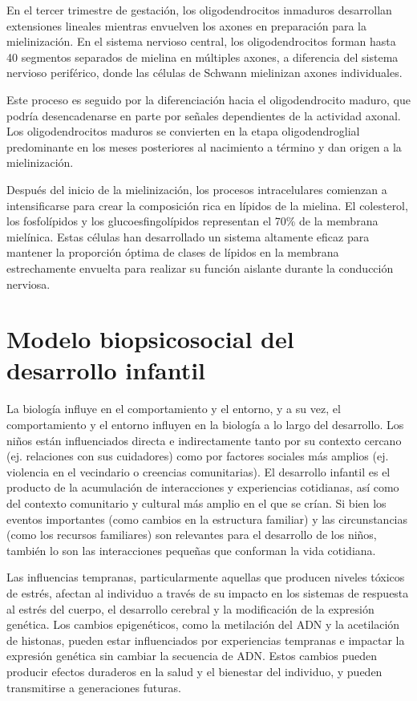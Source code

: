 \documentclass[11pt,letterpaper]{report}
\begin{document}
En el tercer trimestre de gestación, los oligodendrocitos inmaduros desarrollan
extensiones lineales mientras envuelven los axones en preparación para la
mielinización. En el sistema nervioso central, los oligodendrocitos forman
hasta 40 segmentos separados de mielina en múltiples axones, a diferencia del
sistema nervioso periférico, donde las células de Schwann mielinizan axones
individuales. \cite{Polin124}

Este proceso es seguido por la diferenciación hacia el oligodendrocito maduro,
que podría desencadenarse en parte por señales dependientes de la actividad
axonal. Los oligodendrocitos maduros se convierten en la etapa oligodendroglial
predominante en los meses posteriores al nacimiento a término y dan origen a la
mielinización. \cite{Polin124}

Después del inicio de la mielinización, los procesos intracelulares comienzan a
intensificarse para crear la composición rica en lípidos de la mielina. El
colesterol, los fosfolípidos y los glucoesfingolípidos representan el 70\% de
la membrana mielínica. Estas células han desarrollado un sistema altamente
eficaz para mantener la proporción óptima de clases de lípidos en la membrana
estrechamente envuelta para realizar su función aislante durante la conducción
nerviosa. \cite{Polin124}

\section{Modelo biopsicosocial del desarrollo infantil}
La biología influye en el comportamiento y el entorno, y a su vez, el
comportamiento y el entorno influyen en la biología a lo largo del desarrollo.
Los niños están influenciados directa e indirectamente tanto por su contexto
cercano (ej. relaciones con sus cuidadores) como por factores sociales más
amplios (ej. violencia en el vecindario o creencias comunitarias). El
desarrollo infantil es el producto de la acumulación de interacciones y
experiencias cotidianas, así como del contexto comunitario y cultural más
amplio en el que se crían. Si bien los eventos importantes (como cambios en la
estructura familiar) y las circunstancias (como los recursos familiares) son
relevantes para el desarrollo de los niños, también lo son las interacciones
pequeñas que conforman la vida cotidiana. \cite{Feldman3}

Las influencias tempranas, particularmente aquellas que producen niveles
tóxicos de estrés, afectan al individuo a través de su impacto en los sistemas
de respuesta al estrés del cuerpo, el desarrollo cerebral y la modificación de
la expresión genética. Los cambios epigenéticos, como la metilación del ADN y
la acetilación de histonas, pueden estar influenciados por experiencias
tempranas e impactar la expresión genética sin cambiar la secuencia de ADN.
Estos cambios pueden producir efectos duraderos en la salud y el bienestar del
individuo, y pueden transmitirse a generaciones futuras. \cite{Nelson19}
\end{document}
